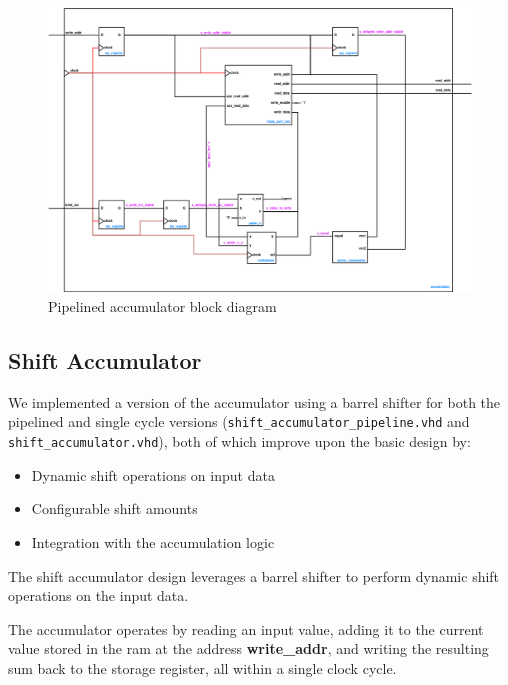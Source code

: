 \documentclass[a4paper,12pt]{article}
\begin{document}
\begin{figure}[H]
    \centering
    \includegraphics[width=1.0\linewidth]{accumulator_pipeline.png}
    \caption{Pipelined accumulator block diagram}
    \label{fig:pipeline}
\end{figure}

\subsection{Shift Accumulator}
We implemented a version of the accumulator using a barrel shifter for both the pipelined and single cycle versions (\texttt{shift\_accumulator\_pipeline.vhd} and \texttt{shift\_accumulator.vhd}), both of which improve upon the basic design by:
\begin{itemize}
    \item Dynamic shift operations on input data
    \item Configurable shift amounts
    \item Integration with the accumulation logic
\end{itemize}

The shift accumulator design leverages a barrel shifter to perform dynamic shift operations on the input data. 

The accumulator operates by reading an input value, adding it to the current value stored in the ram at the address \textbf{write\_addr}, and writing the resulting sum back to the storage register, all within a single clock cycle.
\end{document}
